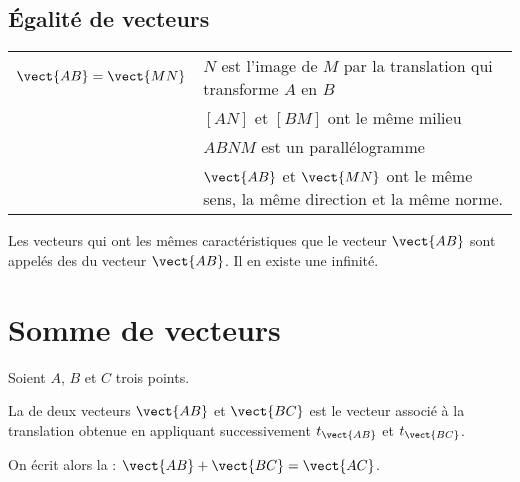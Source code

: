 \documentclass[10pt,openright,twoside,french]{book}
\begin{document}
\subsection{\'Egalité de vecteurs}
\begin{Prop}[(admise)]
    \begin{tabular}{r@{$\qLRq$}l}
        $\vect{AB}= \vect{MN}$ & $N$ est l'image de $M$ par la translation qui transforme $A$ en $B$ \\
                                               & $[AN]$ et $[BM]$ ont le même milieu \\
                                               & $ABNM$ est un parallélogramme \\
                                               & $\vect{AB}$ et $\vect{MN}$ ont le même sens, la même direction et la même norme.
    \end{tabular}
\end{Prop}

\begin{Defi}
    Les vecteurs qui ont les mêmes caractéristiques que le vecteur $\vect{AB}$ sont appelés des  du vecteur $\vect{AB}$. Il en existe une infinité.
\end{Defi}

\section{Somme de vecteurs}

\begin{Defi}
    Soient $A$, $B$ et $C$ trois points.\par
    La  de deux vecteurs $\vect{AB}$ et $\vect{BC}$ est le vecteur associé à la translation obtenue en appliquant successivement $t_{\vect{AB}}$ et $t_{\vect{BC}}$.\par
    On écrit alors la  : $\vect{AB} + \vect{BC} = \vect{AC}$.
    \begin{center}
    \end{center}
\end{Defi}
\end{document}
